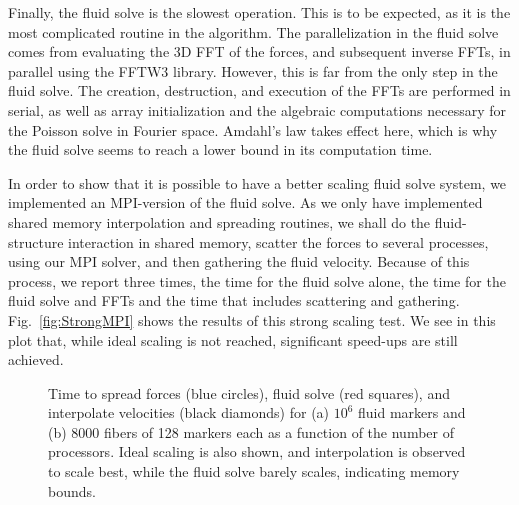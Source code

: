 \documentclass[]{article}
\begin{document}
Finally, the fluid solve is the slowest operation. This is to be expected, as it is the most complicated routine in the algorithm. The parallelization in the fluid solve comes from evaluating the 3D FFT of the forces, and subsequent inverse FFTs, in parallel using the FFTW3 library. However, this is far from the only step in the fluid solve. The creation, destruction, and execution of the FFTs are performed in serial, as well as array initialization and the algebraic computations necessary for the Poisson solve in Fourier space. Amdahl's law takes effect here, which is why the fluid solve seems to reach a lower bound in its computation time. 

In order to show that it is possible to have a better scaling fluid solve system, we implemented an MPI-version of the fluid solve. As we only have implemented shared memory interpolation and spreading routines, we shall do the fluid-structure interaction in shared memory, scatter the forces to several processes, using our MPI solver, and then gathering the fluid velocity. Because of this process, we report three times, the time for the fluid solve alone, the time for the fluid solve and FFTs and the time that includes scattering and gathering. Fig.\ \ref{fig:StrongMPI} shows the results of this strong scaling test. We see in this plot that, while ideal scaling is not reached, significant speed-ups are still achieved. 
\begin{figure}
\centering     
{}
\caption{Time to spread forces (blue circles), fluid solve (red squares), and interpolate velocities (black diamonds) for (a) $10^6$ fluid markers and (b) 8000 fibers of 128 markers each as a function of the number of processors. Ideal scaling is also shown, and interpolation is observed to scale best, while the fluid solve barely scales, indicating memory bounds. }
\label{fig:Strong}
\end{figure}
\end{document}
